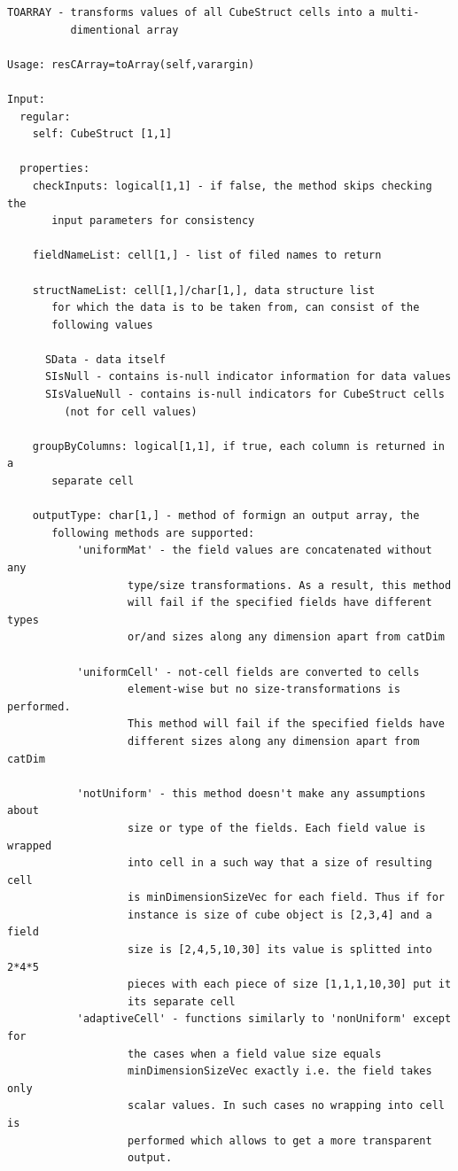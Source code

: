 \documentclass[letterpaper,10pt,english]{sphinxmanual}
\begin{document}
\begin{Verbatim}[commandchars=\\\{\}]
TOARRAY - transforms values of all CubeStruct cells into a multi-
          dimentional array

Usage: resCArray=toArray(self,varargin)

Input:
  regular:
    self: CubeStruct [1,1]

  properties:
    checkInputs: logical[1,1] - if false, the method skips checking the
       input parameters for consistency

    fieldNameList: cell[1,] - list of filed names to return

    structNameList: cell[1,]/char[1,], data structure list
       for which the data is to be taken from, can consist of the
       following values

      SData - data itself
      SIsNull - contains is-null indicator information for data values
      SIsValueNull - contains is-null indicators for CubeStruct cells
         (not for cell values)

    groupByColumns: logical[1,1], if true, each column is returned in a
       separate cell

    outputType: char[1,] - method of formign an output array, the
       following methods are supported:
           'uniformMat' - the field values are concatenated without any
                   type/size transformations. As a result, this method
                   will fail if the specified fields have different types
                   or/and sizes along any dimension apart from catDim

           'uniformCell' - not-cell fields are converted to cells
                   element-wise but no size-transformations is performed.
                   This method will fail if the specified fields have
                   different sizes along any dimension apart from catDim

           'notUniform' - this method doesn't make any assumptions about
                   size or type of the fields. Each field value is wrapped
                   into cell in a such way that a size of resulting cell
                   is minDimensionSizeVec for each field. Thus if for
                   instance is size of cube object is [2,3,4] and a field
                   size is [2,4,5,10,30] its value is splitted into 2*4*5
                   pieces with each piece of size [1,1,1,10,30] put it
                   its separate cell
           'adaptiveCell' - functions similarly to 'nonUniform' except for
                   the cases when a field value size equals
                   minDimensionSizeVec exactly i.e. the field takes only
                   scalar values. In such cases no wrapping into cell is
                   performed which allows to get a more transparent
                   output.


\end{Verbatim}
\end{document}
